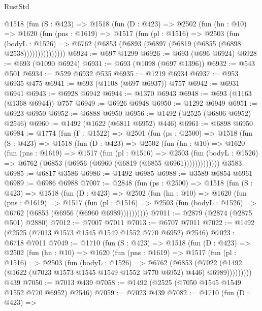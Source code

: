 \begin{lexlean}{RustStd}
\begin{coremodule}
        @1518
          (fun (S : @423) =>
          @1518
            (fun (D : @423) =>
            @2502
              (fun (hn : @10) =>
              @1620
                (fun (pns : @1619) =>
                @1517
                  (fun (pl : @1516) =>
                  @2503
                    (fun (bodyL : @1526) =>
                    @6762 (@6853 (@6893 (@6897 (@6819 (@6855 (@6898 @2538)))))))))))))))
@6924 := @697 @1299
@6926 := @693 (@696 @6924)
@6928 := @693 (@1090 @6924)
@6931 := @693 (@1098 (@697 @1396))
@6932 := @543 @501
@6934 := @529 @6932 @535
@6935 := @1219 @6934
@6937 := @953 @6935 @475
@6941 := @693 (@1108 (@697 @6937)) @757
@6942 := @6931 @6941
@6943 := @6928 @6942
@6944 := @1370 @6943
@6948 := @693 (@1163 (@1368 @6944)) @757
@6949 := @6926 @6948
@6950 := @1292 @6949
@6951 := @6923 @6950
@6952 := @6888 @6950
@6956 := @1492 (@2525 (@6806 @6952) @2546)
@6960 := @1492 (@1622 (@6811 @6952) @446)
@6961 := @6898 @6950
@6984 := @1774
    (fun (Γ : @1522) =>
    @2501
      (fun (ps : @2500) =>
      @1518
        (fun (S : @423) =>
        @1518
          (fun (D : @423) =>
          @2502
            (fun (hn : @10) =>
            @1620
              (fun (pns : @1619) =>
              @1517
                (fun (pl : @1516) =>
                @2503
                  (fun (bodyL : @1526) =>
                  @6762 (@6853 (@6956 (@6960 (@6819 (@6855 @6961)))))))))))))
    @3583
@6985 := @6817 @3586
@6986 := @1492 @6985
@6988 := @3589 @6854 @6961
@6989 := @6986 @6988
@7007 := @2848
    (fun (ps : @2500) =>
    @1518
      (fun (S : @423) =>
      @1518
        (fun (D : @423) =>
        @2502
          (fun (hn : @10) =>
          @1620
            (fun (pns : @1619) =>
            @1517
              (fun (pl : @1516) =>
              @2503 (fun (bodyL : @1526) => @6762 (@6853 (@6956 (@6960 @6989))))))))))
@7011 := @2879 (@2874 (@2875 @501) @2880)
@7012 := @7007 @7011
@7013 := @6707 @7011
@7022 := @1492 (@2525 (@7013 @1573 @1545 @1549 @1552 @770 @6952) @2546)
@7023 := @6718 @7011
@7049 := @1710
    (fun (S : @423) =>
    @1518
      (fun (D : @423) =>
      @2502
        (fun (hn : @10) =>
        @1620
          (fun (pns : @1619) =>
          @1517
            (fun (pl : @1516) =>
            @2503
              (fun (bodyL : @1526) =>
              @6762
                (@6853
                  (@7022
                    (@1492 (@1622 (@7023 @1573 @1545 @1549 @1552 @770 @6952) @446) @6989)))))))))
    @439
@7050 := @7013 @439
@7058 := @1492 (@2525 (@7050 @1545 @1549 @1552 @770 @6952) @2546)
@7059 := @7023 @439
@7082 := @1710
    (fun (D : @423) =>

\end{coremodule}
\end{lexlean}
